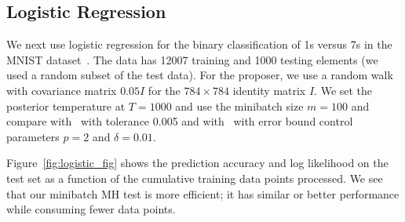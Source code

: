 \documentclass{article}
\begin{document}
\subsection{Logistic Regression}\label{ssec:logistic}

We next use logistic regression for the binary classification of 1s versus 7s in
the MNIST dataset~\cite{lecun-mnisthandwrittendigit-2010}. The data has 12007
training and 1000 testing elements (we used a random subset of the test data).
For the proposer, we use a random walk with covariance matrix $0.05I$ for the
$784\times 784$ identity matrix $I$. We set the posterior temperature at
$T=1000$ and use the minibatch size $m=100$ and compare
with~\cite{cutting_mh_2014} with tolerance 0.005 and
with~\cite{icml2014c1_bardenet14} with error bound control parameters $p = 2$
and $\delta = 0.01$.

Figure~\ref{fig:logistic_fig} shows the prediction accuracy and log likelihood
on the test set as a function of the cumulative training data points processed.
We see that our minibatch MH test
is more efficient; it has similar or better performance while consuming fewer
data points.
\end{document}
